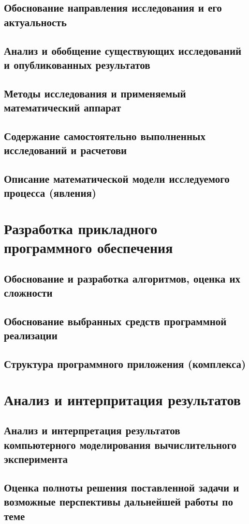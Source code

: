 \documentclass[14pt]{article}
\begin{document}
\subsection{Обоснование направления исследования и его актуальность}
\subsection{Анализ и обобщение существующих исследований и опубликованных результатов}
\subsection{Методы исследования и применяемый математический аппарат}
\subsection{Содержание самостоятельно выполненных исследований и расчетови}
\subsection{Описание математической модели исследуемого процесса (явления)}
\newpage
\section{Разработка прикладного программного обеспечения}
\subsection{Обоснование и разработка алгоритмов, оценка их сложности}
\subsection{Обоснование выбранных средств программной реализации}
\subsection{Структура программного приложения (комплекса)}
\newpage
\section{Анализ и интерпритация результатов}
\subsection{Анализ и интерпретация результатов компьютерного моделирования \hfill\break вычислительного эксперимента}
\subsection{Оценка полноты решения поставленной задачи и возможные перспективы дальнейшей работы по теме}
\newpage
\end{document}
